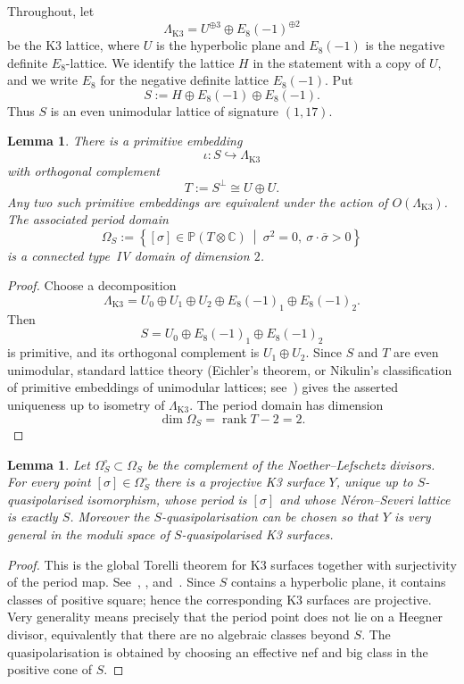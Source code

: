 \documentclass[11pt]{article}
\newtheorem{lemma}[theorem]{Lemma}
\theoremstyle{remark}
\numberwithin{equation}{section}
\begin{document}
Throughout, let
\[
\Lambda_{\mathrm{K3}}
=
U^{\oplus 3}\oplus E_8(-1)^{\oplus 2}
\]
be the K3 lattice, where \(U\) is the hyperbolic plane and \(E_8(-1)\) is the negative definite \(E_8\)-lattice. We identify the lattice \(H\) in the statement with a copy of \(U\), and we write \(E_8\) for the negative definite lattice \(E_8(-1)\). Put
\[
S:=H\oplus E_8(-1)\oplus E_8(-1).
\]
Thus \(S\) is an even unimodular lattice of signature \((1,17)\).

\begin{lemma}\label{lem:embedding}
There is a primitive embedding
\[
\iota\colon S\hookrightarrow \Lambda_{\mathrm{K3}}
\]
with orthogonal complement
\[
T:=S^\perp \cong U\oplus U.
\]
Any two such primitive embeddings are equivalent under the action of \(O(\Lambda_{\mathrm{K3}})\). The associated period domain
\[
\Omega_S
:=
\left\{
[\sigma]\in \mathbb P(T\otimes \mathbb C)
\ \middle|\ 
\sigma^2=0,\ \sigma\cdot \overline{\sigma}>0
\right\}
\]
is a connected type~IV domain of dimension \(2\).
\end{lemma}

\begin{proof}
Choose a decomposition
\[
\Lambda_{\mathrm{K3}}
=
U_0\oplus U_1\oplus U_2\oplus E_8(-1)_1\oplus E_8(-1)_2.
\]
Then
\[
S=U_0\oplus E_8(-1)_1\oplus E_8(-1)_2
\]
is primitive, and its orthogonal complement is \(U_1\oplus U_2\). Since \(S\) and \(T\) are even unimodular, standard lattice theory (Eichler's theorem, or Nikulin's classification of primitive embeddings of unimodular lattices; see~\cite[Section~1]{Nik80}) gives the asserted uniqueness up to isometry of \(\Lambda_{\mathrm{K3}}\). The period domain has dimension
\[
\dim \Omega_S=\operatorname{rank}T-2=2.
\]
\end{proof}

\begin{lemma}\label{lem:periods-S}
Let \(\Omega_S^\circ\subset \Omega_S\) be the complement of the Noether--Lefschetz divisors. For every point \([\sigma]\in \Omega_S^\circ\) there is a projective K3 surface \(Y\), unique up to \(S\)-quasipolarised isomorphism, whose period is \([\sigma]\) and whose Néron--Severi lattice is exactly \(S\). Moreover the \(S\)-quasipolarisation can be chosen so that \(Y\) is very general in the moduli space of \(S\)-quasipolarised K3 surfaces.
\end{lemma}

\begin{proof}
This is the global Torelli theorem for K3 surfaces together with surjectivity of the period map. See~\cite{PSS71}, \cite{SD74}, and~\cite[Chapter~8]{Huy16}. Since \(S\) contains a hyperbolic plane, it contains classes of positive square; hence the corresponding K3 surfaces are projective. Very generality means precisely that the period point does not lie on a Heegner divisor, equivalently that there are no algebraic classes beyond \(S\). The quasipolarisation is obtained by choosing an effective nef and big class in the positive cone of \(S\).
\end{proof}
\end{document}
